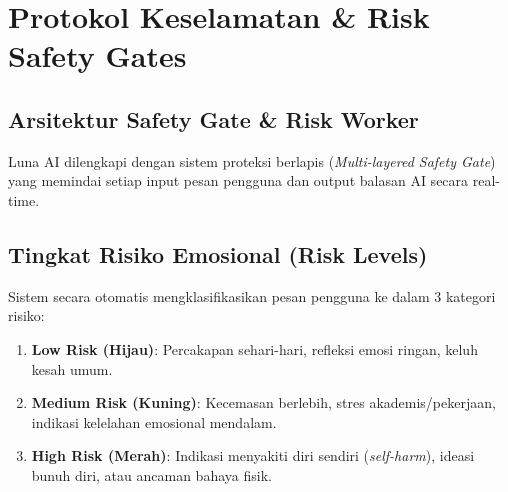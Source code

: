 \chapter{Protokol Keselamatan \& Risk Safety Gates}

\section{Arsitektur Safety Gate \& Risk Worker}
Luna AI dilengkapi dengan sistem proteksi berlapis (\textit{Multi-layered Safety Gate}) yang memindai setiap input pesan pengguna dan output balasan AI secara real-time.

\begin{center}
\end{center}

\section{Tingkat Risiko Emosional (Risk Levels)}
Sistem secara otomatis mengklasifikasikan pesan pengguna ke dalam 3 kategori risiko:
\begin{enumerate}
    \item \textbf{Low Risk (Hijau)}: Percakapan sehari-hari, refleksi emosi ringan, keluh kesah umum.
    \item \textbf{Medium Risk (Kuning)}: Kecemasan berlebih, stres akademis/pekerjaan, indikasi kelelahan emosional mendalam.
    \item \textbf{High Risk (Merah)}: Indikasi menyakiti diri sendiri (\textit{self-harm}), ideasi bunuh diri, atau ancaman bahaya fisik.
\end{enumerate}

